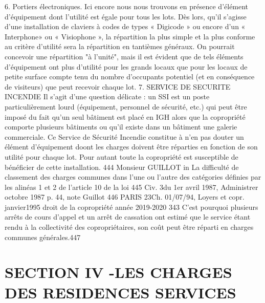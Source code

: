 		6. Portiers électroniques.
		Ici encore nous nous trouvons en présence d'élément d'équipement dont l'utilité est égale pour tous les lots. Dès lors, qu'il s'agisse d'une installation de claviers à codes de types « Digicode » ou encore d'un « Interphone» ou « Visiophone », la répartition la plus simple et la plus conforme au critère d'utilité sera la répartition en tantièmes généraux.
		On pourrait concevoir une répartition "à l'unité", mais il est évident que de tels éléments d'équipement ont plus d'utilité pour les grands locaux que pour les locaux de petite surface compte tenu du nombre d'occupants potentiel (et en conséquence de visiteurs) que peut recevoir chaque lot.
		7. SERVICE DE SECURITE INCENDIE
		Il s’agit d’une question délicate : un SSI est un poste particulièrement lourd (équipement, personnel de sécurité, etc.) qui peut être imposé du fait qu’un seul bâtiment est placé en IGH alors que la copropriété comporte plusieurs bâtiments ou qu’il existe dans un bâtiment une galerie commerciale.
		Ce Service de Sécurité Incendie constitue à n’en pas douter un élément d’équipement doont les charges doivent être réparties en fonction de son utilité pour chaque lot.
		Pour autant toute la copropriété est susceptible de bénéficier de cette installation.
		444 Monsieur GUILLOT in La difficulté de classement des charges communes dans l'une ou l'autre des catégories définies par les alinéas 1 et 2 de l'article 10 de la loi
		445 Civ. 3\degres du 1er avril 1987, Administrer octobre 1987 p. 44, note Guillot
		446 PARIS 23\degres Ch. 01/07/94, Loyers et copr. janvier1995 
		droit de la copropriété année 2019-2020
		343
		C’est pourquoi plusieurs arrêts de cours d’appel et un arrêt de cassation ont estimé que le service étant rendu à la collectivité des copropriétaires, son coût peut être réparti en charges communes générales.447
	
\section{SECTION IV -LES CHARGES DES RESIDENCES SERVICES}
	
